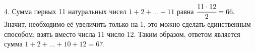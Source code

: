 4. Сумма первых 11 натуральных чисел $1+2+\ldots+11$ равна $\cfrac{11\cdot12}{2}=66.$ Значит, необходимо её увеличить только на 1, это можно сделать единственным способом: взять вместо числа 11 число 12. Таким образом, ответом является сумма $1+2+\ldots+10+12=67.$\\
